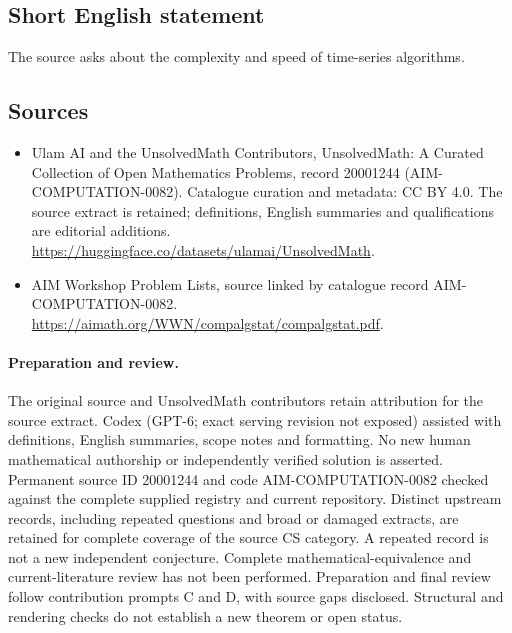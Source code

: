 \documentclass[11pt]{article}
\begin{document}
\subsection{Short English statement}
The source asks about the complexity and speed of time-series algorithms.
\subsection{Sources}
\begin{itemize}
\item[\hypertarget{source:20001244:1}{S1}] Ulam AI and the UnsolvedMath Contributors, UnsolvedMath: A Curated Collection of Open Mathematics Problems, record 20001244 (AIM-COMPUTATION-0082). Catalogue curation and metadata: CC BY 4.0. The source extract is retained; definitions, English summaries and qualifications are editorial additions.
\url{https://huggingface.co/datasets/ulamai/UnsolvedMath}.
\item[\hypertarget{source:20001244:2}{S2}] AIM Workshop Problem Lists, source linked by catalogue record AIM-COMPUTATION-0082.
\url{https://aimath.org/WWN/compalgstat/compalgstat.pdf}.
\end{itemize}
\paragraph{Preparation and review.}
The original source and UnsolvedMath contributors retain attribution for the source extract. Codex (GPT-6; exact serving revision not exposed) assisted with definitions, English summaries, scope notes and formatting. No new human mathematical authorship or independently verified solution is asserted. Permanent source ID 20001244 and code AIM-COMPUTATION-0082 checked against the complete supplied registry and current repository. Distinct upstream records, including repeated questions and broad or damaged extracts, are retained for complete coverage of the source CS category. A repeated record is not a new independent conjecture. Complete mathematical-equivalence and current-literature review has not been performed. Preparation and final review follow contribution prompts C and D, with source gaps disclosed. Structural and rendering checks do not establish a new theorem or open status.
\label{end:20001244}
\end{document}
